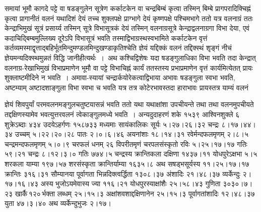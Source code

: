 \documentclass[11pt, openany]{book}
\begin{document}
\begin{sloppypar}
समायां भूमौ कागदे पट्टे वा षडङ्गुलेन सूत्रेण कर्काटकेन वा चन्द्रबिम्बं कृत्वा तस्मिन् बिम्बे प्रागपरादिक्चिह्नं कृत्वा प्रागानीतं वलनं यथादिशं देयं तच्च शुक्लपक्षे प्राग्भागे देयं कृष्णपक्षे पश्चिमभागे ततो यत्र वलनाग्रं ततः केन्द्राभिमुखं सूत्रं प्रसार्य्य तस्मिन् सूत्रे विभासूत्रकं देयं तस्मिन् वलनाग्रसूत्रे केन्द्राद्वलनाग्रगा विभा देया, एवं कदाचिद्बिम्बमुल्लिख्य दूरेऽपि विभासूत्रं भवति तस्माद्विभाग्रस्थस्वभामिते कर्काटकेन वृत्तं कर्तव्यमस्माद्वृत्ताद्बहिर्भूतमिन्दुमण्डलमिन्दुखण्डाकृतिश्चेति ज्ञेयं यद्दिक्कं वलनं तद्दिक्स्थं शृङ्गं नीचं ज्ञेयमन्यदिक्स्थमुन्नतं विद्धि जानीहीत्यर्थः~।~अथ कश्चिद्विशेषः यदा षडङ्गुलाधिका विभा भवति तदा केन्द्रात् वलनाग्र-रेखाभिमुखं विभाप्रमाणेन भूमौ वा पट्टे विभाचिह्नं कार्यं ततस्तस्य प्रभाप्रमाणेन वृत्तं कार्यमित्येतत् प्रायः शुक्लाष्टमीदिने न भवति~। अमावा-स्यायां चन्द्रार्कयोरेकत्वाद्विभाया अभावः षडङ्गुला स्वभा भवति, अष्टम्याम् अष्टादशाङ्गुला विभा स्वभा च भवति यत्र तत्र कोटेरभावस्तदा हाराभावः प्रायस्तत्र याम्यं वलनं
\end{sloppypar}

\newpage

\begin{sloppypar}
\noindent ज्ञेयं शिवपुर्यां परमवलनमङ्गुलचतुष्टयासन्नं भवति ततो यथा यथाक्षांशा उपचीयन्ते तथा तथा वलनमुपचीयते तद्दक्षिणस्यामेव भवत्युत्तरवलनं त्वेकाङ्गुलमध्ये भवति~। अन्यदुदाहरणं शके १५३९ आश्विनशुक्ले ६ शुक्रेऽब्दाः ४३४ उदयेऽहर्गणः १५८७३३ मध्यमाः सायंकालिकः सूर्यः ५।२७।२६।३२ चन्द्रः ८।१७।४४।३४ उच्चम् ५।२२।२०।२८ पातः २।०।६।४६ अयनांशाः १८।१४।३१ रवेर्मन्दफलमृणम् २।८।५ चन्द्रमन्दफलमृणम् ५।०।९ चरफलं धनम् २६ विपरीतमृणं चरपलसंस्कृतो रविः ५।२५।१७।१७ गतिः ५९।२१ चन्द्रः ८।१२।३।० गतिः ७७४।५ चन्द्रस्य क्रान्तिकला दक्षिणा १४३७।११ योधपुरेऽक्षभा ५।५ शरकला याम्या १९७।५७ शरसंस्कृता क्रान्तिर्याम्या १६३५।८ अथ सषड्भसूर्यस्य ११।२५।१७।१७ क्रान्तिः ३१६।३१ सौम्यानया पूर्वागता भिन्नदिक्त्वर्द्धिता १३०८।३७ अंशादिः २१।४८।३७ व्यर्केन्दुः २।१७।१६।४३ अस्य भुजोऽयमेवास्य ज्या ११६।२१ योधपुरस्याक्षांशैः २५।५८।४३ गुणिता ३०३०।७।२३ खार्कै\textendash \,१२०\textendash \,र्भक्ता लब्धम् २५।१५।३ अक्षांशवशाद्दक्षिणानेन २५।१५।३ पूर्वागतांशादिः १२।४८।३७ युता ४७।३।४० अथ व्यर्केन्दुभुजः २।१७।
\end{sloppypar}

\newpage
\end{document}
